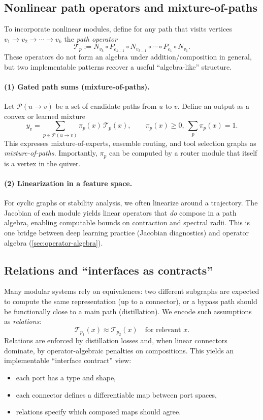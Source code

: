 \documentclass[11pt]{article}
\theoremstyle{definition}
\theoremstyle{plain}
\theoremstyle{remark}
\newcommand{\mc}[1]{\mathcal{#1}}
\begin{document}
\subsection{Nonlinear path operators and mixture-of-paths}

To incorporate nonlinear modules, define for any path that visits vertices $v_1\to v_2\to\cdots\to v_k$ the \emph{path operator}
\[
\mc{T}_p := N_{v_k}\circ P_{e_{k-1}}\circ N_{v_{k-1}}\circ \cdots \circ P_{e_1}\circ N_{v_1}.
\]
These operators do not form an algebra under addition/composition in general, but two implementable patterns recover a useful ``algebra-like'' structure.

\paragraph{(1) Gated path sums (mixture-of-paths).}
Let $\mc{P}(u\to v)$ be a set of candidate paths from $u$ to $v$.
Define an output as a convex or learned mixture
\[
y_v = \sum_{p\in \mc{P}(u\to v)} \pi_p(x)\,\mc{T}_p(x),
\qquad \pi_p(x)\ge 0,\ \sum_p \pi_p(x)=1.
\]
This expresses mixture-of-experts, ensemble routing, and tool selection graphs as \emph{mixture-of-paths}.
Importantly, $\pi_p$ can be computed by a router module that itself is a vertex in the quiver.

\paragraph{(2) Linearization in a feature space.}
For cyclic graphs or stability analysis, we often linearize around a trajectory.
The Jacobian of each module yields linear operators that \emph{do} compose in a path algebra, enabling computable bounds on contraction and spectral radii.
This is one bridge between deep learning practice (Jacobian diagnostics) and operator algebra (\cref{sec:operator-algebra}).

\subsection{Relations and ``interfaces as contracts''}
Many modular systems rely on equivalences:
two different subgraphs are expected to compute the same representation (up to a connector), or a bypass path should be functionally close to a main path (distillation).
We encode such assumptions as \emph{relations}:
\[
\mc{T}_{p_1}(x) \approx \mc{T}_{p_2}(x) \quad\text{for relevant }x.
\]
Relations are enforced by distillation losses and, when linear connectors dominate, by operator-algebraic penalties on compositions.
This yields an implementable ``interface contract'' view:
\begin{itemize}[leftmargin=2em]
\item each port has a type and shape,
\item each connector defines a differentiable map between port spaces,
\item relations specify which composed maps should agree.
\end{itemize}
\end{document}
